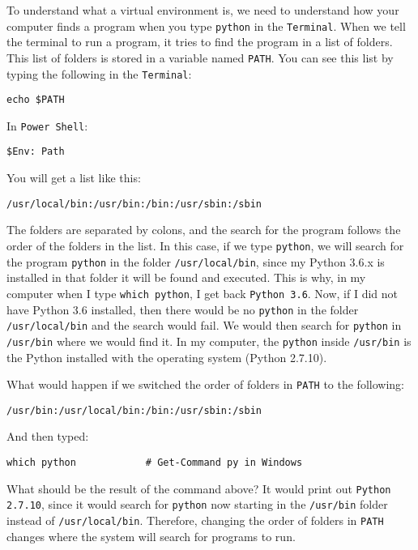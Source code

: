 \documentclass[12pt, a4paper]{article}
\begin{document}
To understand what a virtual environment is, we need to understand how your computer finds a program when you type \texttt{python} in the \texttt{Terminal}.
When we tell the terminal to run a program, it tries to find the program in a list of folders.
This list of folders is stored in a variable named \texttt{PATH}.
You can see this list by typing the following in the \texttt{Terminal}:
\lstset{language=bash,label= ,caption= ,captionpos=b,firstnumber=1,numbers=left,style=bash}
\begin{lstlisting}
echo $PATH
\end{lstlisting}
In \texttt{Power Shell}:
\lstset{language=bash,label= ,caption= ,captionpos=b,firstnumber=1,numbers=left,style=powershell}
\begin{lstlisting}
$Env: Path
\end{lstlisting}
You will get a list like this:
\lstset{language=bash,label= ,caption= ,captionpos=b,firstnumber=1,numbers=left,style=bash}
\begin{lstlisting}
/usr/local/bin:/usr/bin:/bin:/usr/sbin:/sbin
\end{lstlisting}
The folders are separated by colons, and the search for the program follows the order of the folders in the list.
In this case, if we type \texttt{python}, we will search for the program \texttt{python} in the folder \texttt{/usr/local/bin}, since my Python 3.6.x is installed in that folder it will be found and executed.
This is why, in my computer when I type \texttt{which python}, I get back \texttt{Python 3.6}.
Now, if I did not have Python 3.6 installed, then there would be no \texttt{python} in the folder \texttt{/usr/local/bin} and the search would fail.
We would then search for \texttt{python} in \texttt{/usr/bin} where we would find it.
In my computer, the \texttt{python} inside \texttt{/usr/bin} is the Python installed with the operating system (Python 2.7.10).

What would happen if we switched the order of folders in \texttt{PATH} to the following:
\lstset{language=bash,label= ,caption= ,captionpos=b,firstnumber=1,numbers=left,style=bash}
\begin{lstlisting}
/usr/bin:/usr/local/bin:/bin:/usr/sbin:/sbin
\end{lstlisting}
And then typed:
\lstset{language=bash,label= ,caption= ,captionpos=b,firstnumber=1,numbers=left,style=bash}
\begin{lstlisting}
which python			# Get-Command py in Windows
\end{lstlisting}
What should be the result of the command above?
It would print out \texttt{Python 2.7.10}, since it would search for \texttt{python} now starting in the \texttt{/usr/bin} folder instead of \texttt{/usr/local/bin}.
Therefore, changing the order of folders in \texttt{PATH} changes where the system will search for programs to run.
\end{document}
